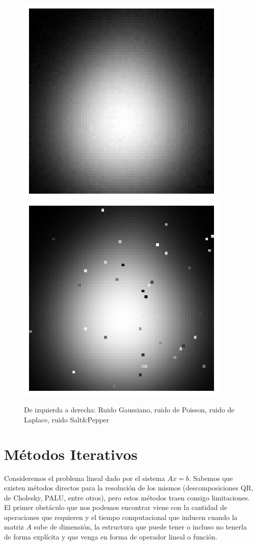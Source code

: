 \documentclass[12pt, oneside]{book}
\begin{document}
\begin{figure}[H]
		\includegraphics[scale=0.3]{Imagenes/mate_Laplace.png}
		\includegraphics[scale=0.3]{Imagenes/mate_saltpepper.png}
		\caption{De izquierda a derecha: Ruido Gaussiano, ruido de Poisson, ruido de Laplace, ruido Salt\&Pepper\\}
	\end{figure}
	
\section{Métodos Iterativos}

Consideremos el problema lineal dado por el sistema $Ax = b$. Sabemos que existen métodos directos para la resolución de los mismos (descomposiciones QR, de Cholesky, PALU, entre otros), pero estos métodos traen consigo limitaciones. El primer obstáculo que nos podemos encontrar viene con la cantidad de operaciones que requieren y el tiempo computacional que inducen cuando la matriz $A$ sube de dimensión, la estructura que puede tener o incluso no tenerla de forma explícita y que venga en forma de operador lineal o función.
\end{document}
